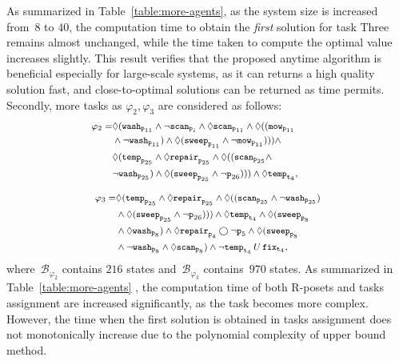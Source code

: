 As summarized in Table~\ref{table:more-agents},
as the system size is increased from~$8$ to $40$,
the computation time to obtain the \emph{first}
solution for task Three remains almost unchanged,
while the time taken to compute the optimal value increases slightly.
This result verifies that the proposed anytime algorithm is beneficial
especially for large-scale systems, as it can returns a high quality solution fast,
and close-to-optimal solutions can be returned as time permits.
Secondly, more tasks as $\varphi_2,\varphi_3$ are considered as follows:
\begin{equation}\footnotesize
\label{eq:task2}
\begin{aligned}
\varphi_2 = &\Diamond (\texttt{wash}_{\texttt{p}_{11}} \land \lnot\texttt{scan}_{\texttt{p}_i} \wedge\Diamond \texttt{scan}_{\texttt{p}_{11}}\wedge \Diamond ((\texttt{mow}_{\texttt{p}_{11}}\quad\quad\quad \\
&\wedge\lnot \texttt{wash}_{\texttt{p}_{11}} ) \wedge\Diamond (\texttt{sweep}_{\texttt{p}_{11}} \land \lnot\texttt{mow}_{\texttt{p}_{11}} )))\wedge\\
&\Diamond (\texttt{temp}_{\texttt{p}_{25}} \land \Diamond \texttt{repair}_{\texttt{p}_{25}}\wedge \Diamond ((\texttt{scan}_{\texttt{p}_{25}}\wedge\\
&\lnot \texttt{wash}_{\texttt{p}_{25}} ) \wedge\Diamond (\texttt{sweep}_{\texttt{p}_{25}} \land \lnot{\texttt{p}_{26}} ))) \wedge  \Diamond
\texttt{temp}_{\texttt{t}_4},
\end{aligned}
\end{equation}

\begin{equation}\footnotesize
\label{eq:task3}
\begin{aligned}
\varphi_3 = &\Diamond (\texttt{temp}_{\texttt{p}_{25}} \land\Diamond \texttt{repair}_{\texttt{p}_{25}}
\wedge \Diamond ((\texttt{scan}_{\texttt{p}_{25}}\wedge
\lnot \texttt{wash}_{\texttt{p}_{25}} ) \\
&\wedge\Diamond (\texttt{sweep}_{\texttt{p}_{25}} \land \lnot{\texttt{p}_{26}} ))) \wedge  \Diamond
\texttt{temp}_{\texttt{t}_4}
\wedge  \Diamond (\texttt{sweep}_{\texttt{p}_{8}}\\& \wedge \Diamond \texttt{wash}_{\texttt{p}_{8}} )\land \Diamond \texttt{repair}_{\texttt{p}_4} \bigcirc \lnot \texttt{p}_5 \wedge \Diamond ( \texttt{sweep}_{\texttt{p}_{8}}\\
& \wedge \lnot \texttt{wash}_{\texttt{p}_{8}} \wedge\Diamond
\texttt{scan}_{\texttt{p}_{8}} )\wedge \lnot \texttt{temp}_{\texttt{t}_4} \,U \, \texttt{fix}_{\texttt{t}_{4}},
\end{aligned}
\end{equation}
where~$\mathcal{B}_{\varphi_2}$ contains $216$ states
	 and~$\mathcal{B}_{\varphi_3}$ contains~$970$ states.
	As summarized in Table~\ref{table:more-agents} , the computation time of
	 both R-posets and tasks assignment are increased significantly, as the task becomes more
	 complex.
	 However, the time when the first solution is obtained in tasks assignment does not monotonically increase due to
	 the polynomial complexity of upper bound method.





